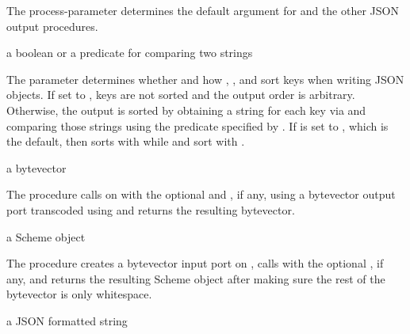 The  process-parameter determines the default
 argument for  and the other JSON
output procedures.

\begin{parameter}
\end{parameter}
\returns{} a boolean or a predicate for comparing two strings

The  parameter determines whether and how
, , and  sort keys
when writing JSON objects.
If set to , keys are not sorted and the output order is arbitrary.
Otherwise, the output is sorted by obtaining a string for each key
via  and comparing those strings using the predicate
specified by .
If  is set to , which is the default,
then  sorts with 
while  and  sort with
.

\begin{procedure}
\end{procedure}
\returns{} a bytevector

The  procedure calls 
on  with the optional  and , if
any, using a bytevector output port transcoded using
 and returns the resulting bytevector.

\begin{procedure}
\end{procedure}
\returns{} a Scheme object

The  procedure creates a bytevector input port
on , calls  with the optional ,
if any, and returns the resulting Scheme object after making sure the rest
of the bytevector is only whitespace.

\begin{procedure}
\end{procedure}
\returns{} a JSON formatted string

